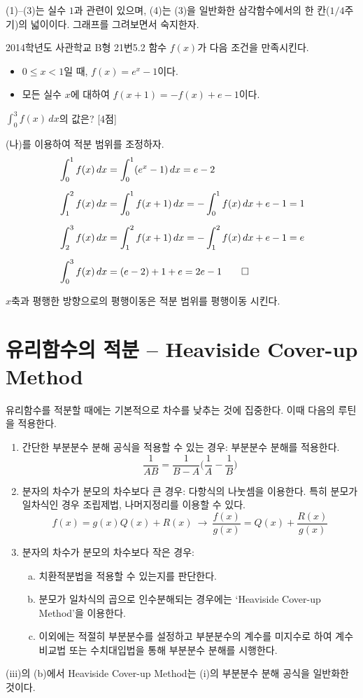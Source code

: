 \documentclass{article}
\begin{document}
(1)--(3)는 실수 $1$과 관련이 있으며, (4)는 (3)을 일반화한 삼각함수에서의 한 칸($1/4$주기)의 넓이이다. 그래프를 그려보면서 숙지한자.

\begin{exc}{2014학년도 사관학교 B형 21번}{5.2}
	함수 $f(x)$가 다음 조건을 만족시킨다.
	\begin{hint}
		\begin{itemize}
			\item[(가)] $0\leq x<1$일 때, $f(x)=e^x-1$이다.
			\item[(나)] 모든 실수 $x$에 대하여 $f(x+1)=-f(x)+e-1$이다.
		\end{itemize}
	\end{hint}
	$\displaystyle\int_0^3f(x)\,dx$의 값은? [4점]
\end{exc}

\begin{sol}
	(나)를 이용하여 적분 범위를 조정하자.
	\begin{align*}
		&\int_0^1f(x)\,dx=\int_0^1(e^x-1)\,dx=e-2\\[6pt]
		&\int_1^2f(x)\,dx=\int_0^1f(x+1)\,dx=-\int_0^1f(x)\,dx+e-1=1\\[6pt]
		&\int_2^3f(x)\,dx=\int_1^2f(x+1)\,dx=-\int_1^2f(x)\,dx+e-1=e\\[6pt]
		&\int_0^3f(x)\,dx=(e-2)+1+e=2e-1\qed
	\end{align*}
\end{sol}

\begin{remark}
	$x$축과 평행한 방향으로의 평행이동은 적분 범위를 평행이동 시킨다.
\end{remark}

\newpage
\section{유리함수의 적분 -- Heaviside Cover-up Method}
유리함수를 적분할 때에는 기본적으로 차수를 낮추는 것에 집중한다. 이때 다음의 루틴을 적용한다.
\begin{enumerate}
	\item 간단한 부분분수 분해 공식을 적용할 수 있는 경우: 부분분수 분해를 적용한다.
		\[
			\frac{1}{AB}=\frac{1}{B-A}\biggl(\frac{1}{A}-\frac{1}{B}\biggr)
		\]
	\item 분자의 차수가 분모의 차수보다 큰 경우: 다항식의 나눗셈을 이용한다. 특히 분모가 일차식인 경우 조립제법, 나머지정리를 이용할 수 있다.
		\[
			f(x)=g(x)Q(x)+R(x)~\longrightarrow~\frac{f(x)}{g(x)}=Q(x)+\frac{R(x)}{g(x)}
		\]
	\item 분자의 차수가 분모의 차수보다 작은 경우:
		\begin{enumerate}[(a)]
			\item 치환적분법을 적용할 수 있는지를 판단한다.
			\item 분모가 일차식의 곱으로 인수분해되는 경우에는 ‘Heaviside Cover-up Method’을 이용한다.
			\item 이외에는 적절히 부분분수를 설정하고 부분분수의 계수를 미지수로 하여 계수비교법 또는 수치대입법을 통해 부분분수 분해를 시행한다.
		\end{enumerate}
\end{enumerate}
(iii)의 (b)에서 Heaviside Cover-up Method는 (i)의 부분분수 분해 공식을 일반화한 것이다.
\end{document}
